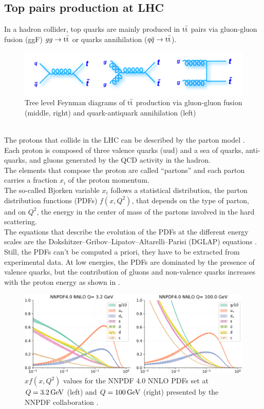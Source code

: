 \subsection{Top pairs production at LHC}
In a hadron collider, top quarks are mainly produced in ${{\text{t}}{\bar{\text{t}}}}$ pairs via gluon-gluon fusion (ggF) $gg \to {\ensuremath{{\text{t}}{\bar{\text{t}}}}}$ or quarks annihilation (${q}\bar{{q}} \to {\ensuremath{{\text{t}}{\bar{\text{t}}}}}$).
\begin{figure}[h!]
    \centering
    \includegraphics[width=0.8\linewidth]{fig//chap02-theory/ttbar.png}
    \caption{Tree level Feynman diagrams of ${{\text{t}}{\bar{\text{t}}}}$ production via gluon-gluon fusion (middle, right) and quark-antiquark annihilation (left)}
    \label{fig:tt_prod}
\end{figure}\\
The protons that collide in the LHC can be described by the parton model \cite{Feynman1969TheEnergies}.\\
Each proton is composed of three valence quarks (uud) and a sea of quarks, anti-quarks, and gluons generated by the QCD activity in the hadron.\\ 
The elements that compose the proton are called “partons” and each parton carries a fraction $x_i$ of the proton momentum.\\
The so-called Bjorken variable $x_i$ follows a statistical distribution, the parton distribution functions (PDFs) $f(x, Q^2)$, that depends on the type of parton, and on $Q^2$, the energy in the center of mass of the partons involved in the hard scattering.\\
The equations that describe the evolution of the PDFs at the different energy scales are the Dokshitzer–Gribov–Lipatov–Altarelli–Parisi (DGLAP) equations \cite{Altarelli1977AsymptoticLanguage,Gribov1972DeepTheory,Dokshitzer1977CalculationChromodynamics.}. Still, the PDFs can't be computed a priori, they have to be extracted from experimental data.
At low energies, the PDFs are dominated by the presence of valence quarks, but the contribution of gluons and non-valence quarks increases with the proton energy as shown in .
\\
\begin{figure}[h!]
    \centering
    \includegraphics[width=1\linewidth]{fig//chap02-theory/pdf.png}
    \caption{$xf(x,Q^2)$ values for the NNPDF 4.0 NNLO PDFs set at $Q=3.2{\,\text{Ge\hspace{-.08em}V}}$ (left) and $Q=100 {\,\text{Ge\hspace{-.08em}V}}$ (right) presented by the NNPDF collaboration \cite{Ball2022TheAccuracy}. }
    \label{fig:pdf}
\end{figure}
